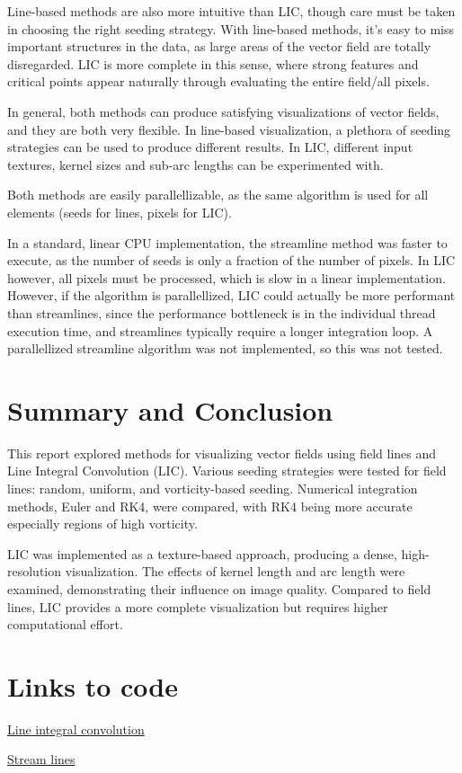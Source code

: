\documentclass{article}
\begin{document}
Line-based methods are also more intuitive than LIC, though care must be taken in choosing the right seeding strategy. With line-based methods, it's easy to miss
important structures in the data, as large areas of the vector field are totally disregarded. LIC is more complete in this sense, where strong features and critical points
appear naturally through evaluating the entire field/all pixels.

In general, both methods can produce satisfying visualizations of vector fields, and they are
both very flexible. In line-based visualization, a plethora of seeding strategies can be used to produce different results.
In LIC, different input textures, kernel sizes and sub-arc lengths can be experimented with.

Both methods are easily parallellizable, as the same algorithm is used for all elements (seeds for lines, pixels for LIC). 

In a standard, linear CPU implementation, the streamline method was faster to execute, as the number of seeds is only a fraction of the number of pixels. In LIC however, all pixels must be processed, which is slow in a linear implementation.
However, if the algorithm is parallellized, LIC could actually be more performant than streamlines, since the performance bottleneck is in the individual thread execution time, and streamlines typically require a longer integration loop. 
A parallellized streamline algorithm was not implemented, so this was not tested.

\section{Summary and Conclusion}
This report explored methods for visualizing vector fields using field lines and Line Integral Convolution (LIC). Various seeding strategies were tested for field lines: random, uniform, and vorticity-based seeding. Numerical integration methods, Euler and RK4, were compared, with RK4 being more accurate especially regions of high vorticity.

LIC was implemented as a texture-based approach, producing a dense, high-resolution visualization. The effects of kernel length and arc length were examined, demonstrating their influence on image quality. Compared to field lines, LIC provides a more complete visualization but requires higher computational effort.


\section*{Links to code}
\href{https://github.com/edvartGB/visualization/blob/main/oblig/lic_vectorized.ipynb}{Line integral convolution}

\noindent \href{https://github.com/edvartGB/visualization/blob/main/oblig/oblig.ipynb}{Stream lines}
\end{document}
